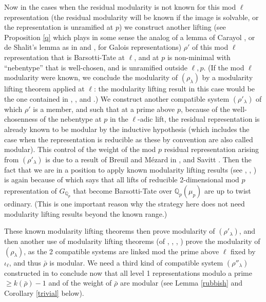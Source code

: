 \documentclass[12pt]{amsart}
\newcommand{\Q}{\mathbb{Q}}
\newcommand{\rhobar}{\overline{\rho}}
\def\rhobar{ {\bar {\rho} } }
\begin{document}
Now in the cases when the residual modularity is not known for this mod $\ell$ representation 
(the residual modularity will be known if the image is solvable, or the representation is unramified at $p$) we 
construct another lifting (see Proposition \ref{q} which plays in some sense the analog of a lemma of Carayol \cite{car}, or 
de Shalit's lemma as in \cite{Wiles} and \cite{TW}, for Galois representations) 
$\rho'$ of this mod $\ell$ representation that is Barsotti-Tate at $\ell$, and at $p$ is non-minimal with 
``nebentype'' that is well-chosen, and is unramified outside $\ell,p$. 
(If the mod $\ell$ modularity were known, we conclude the modularity of $(\rho_\lambda)$ 
by a modularity lifting theorem applied at $\ell$: the modularity lifting result in 
this case would be the one contained in \cite{Wiles}, \cite{TW}, \cite{SW2} and \cite{SW3}.)
We construct another compatible 
system $(\rho'_{\lambda})$ of which $\rho'$ is a member, and such that at 
a prime above $p$, because of the well-chosenness of the nebentype at $p$ in the $\ell$-adic lift, the residual representation 
is already known to be modular by the inductive hypothesis (which includes the case when the representation 
is reducible as these by convention are also called modular). This control of the weight of the mod $p$ 
residual representation arising from $(\rho'_{\lambda})$ is due 
to a result of Breuil and M\'ezard in \cite{BM}, and Savitt \cite{Savitt1}. Then the fact that we are 
in a position to apply known modularity lifting results (see \cite{SW2}, \cite{SW3}, \cite{Kisin}) 
is again because of \cite{BM} which says that all lifts of reducible 2-dimensional mod $p$ representation of $G_{\Q_p}$
that become Barsotti-Tate over $\Q_p(\mu_p)$ are up to twist ordinary. (This is one important reason why the 
strategy here does not need modularity lifting results beyond the known range.)

These known modularity lifting theorems then prove modularity of 
$(\rho'_{\lambda})$, and then another use of modularity lifting theorems (of \cite{Wiles}, \cite{TW}, \cite{SW2}, \cite{SW3}) 
prove the modularity of $(\rho_{\lambda})$, as the 2 compatible systems are linked mod the prime above $\ell$ fixed by $\iota_\ell$, 
and thus $\rhobar$ is modular. We need a third kind of compatible system $(\rho''_{\lambda})$
constructed in \cite{KW} to conclude now that all level 1 representations modulo a prime $\geq k(\rhobar)-1$ 
and of the weight of $\rhobar$ are modular (see Lemma \ref{rubbish} and 
Corollary \ref{trivial} below). 
 
\end{document}

